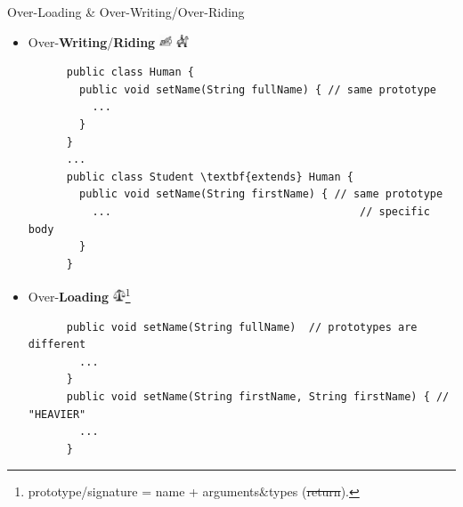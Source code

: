 \documentclass[English,t,%
hyperref={%
    pdftitle={FISA-DE2 OOP in Java},%
    pdfauthor={Guillaume Muller},%
    pdfsubject={OOP in Java},%
    pdfkeywords={OOP,Java}%
    },%
xcolor={pdftex,svgnames} %
]{beamer}
\begin{document}
\begin{frame}[fragile]{Over-Loading \& Over-Writing/Over-Riding}

  \begin{itemize}
%
    \item Over-\textbf{Writing}/\textbf{Riding} \hspace{2em} \includegraphics[width=1em]{images02/writing.png} \hspace{2em} \includegraphics[width=1em]{images02/riding1.png}
    \begin{lstlisting}
      public class Human {
        public void setName(String fullName) { // same prototype
          ...
        }
      }
      ...
      public class Student \textbf{extends} Human {
        public void setName(String firstName) { // same prototype
          ...                                       // specific body
        }
      }
    \end{lstlisting}
%
    \vspace{2em}
    \item Over-\textbf{Loading} \hspace{2em} \includegraphics[width=1em]{images02/overweighted_scale.png}\footnote{prototype/signature = name + arguments\&types (\sout{return}).}
    \begin{lstlisting}
      public void setName(String fullName)  // prototypes are different
        ...
      }
      public void setName(String firstName, String firstName) { // "HEAVIER"
        ...
      }
    \end{lstlisting}
%
  \end{itemize}

\end{frame}
\end{document}
